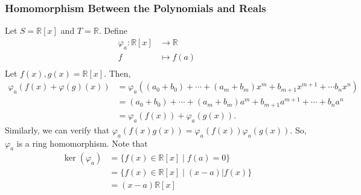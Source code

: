 \documentclass[10pt]{extarticle}
\newcommand{\R}{\mathbb{R}}
\begin{document}
  \subsubsection{Homomorphism Between the Polynomials and Reals}%
  Let $S = \R[x]$ and $T = \R$. Define
  \begin{align*}
    \varphi_{a}: \R[x]&\rightarrow \R\\
    f&\mapsto f(a)\\
  \end{align*}
  Let $f(x),g(x) = \R[x]$. Then,
  \begin{align*}
    \varphi_a(f(x) + \varphi(g)(x)) &= \varphi_a((a_0 + b_0) + \cdots + (a_m + b_m)x^m + b_{m+1}x^{m+1} + \cdots b_nx^n)\\
                                    &= (a_0 + b_0) + \cdots + (a_m + b_m)a^m + b_{m+1}a^{m+1} + \cdots + b_na^n\\
                                    &= \varphi_a(f(x)) + \varphi_a(g(x)).
  \end{align*}
  Similarly, we can verify that $\varphi_a(f(x)g(x)) = \varphi_a(f(x))\varphi_a(g(x))$. So, $\varphi_a$ is a ring homomorphism. Note that
  \begin{align*}
    \ker(\varphi_a) &= \{f(x)\in \R[x]\mid f(a) = 0\}\\
                    &= \{f(x)\in \R[x]\mid (x-a)|f(x)\}\\
                    &= (x-a)\R[x]
  \end{align*}
\end{document}
